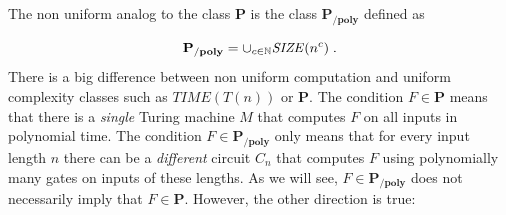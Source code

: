 \hypertarget{nonuniformdef}{}

The non uniform analog to the class \(\mathbf{P}\) is the class
\(\mathbf{P_{/poly}}\) defined as

\[
\mathbf{P_{/poly}} = \cup_{c\in \N} \ensuremath{\mathit{SIZE}}(n^c)  \; . \label{eqppolydef}
\] There is a big difference between non uniform computation and uniform
complexity classes such as \(\ensuremath{\mathit{TIME}}(T(n))\) or
\(\mathbf{P}\). The condition \(F\in \mathbf{P}\) means that there is a
\emph{single} Turing machine \(M\) that computes \(F\) on all inputs in
polynomial time. The condition \(F\in \mathbf{P_{/poly}}\) only means
that for every input length \(n\) there can be a \emph{different}
circuit \(C_n\) that computes \(F\) using polynomially many gates on
inputs of these lengths. As we will see, \(F\in \mathbf{P_{/poly}}\)
does not necessarily imply that \(F\in \mathbf{P}\). However, the other
direction is true:


